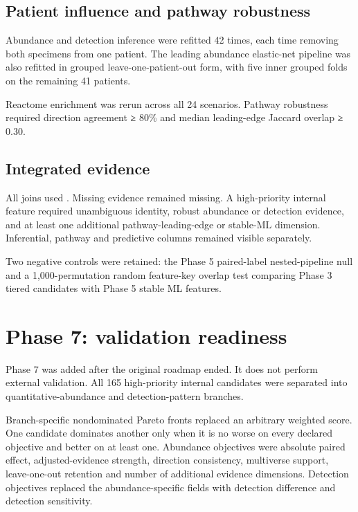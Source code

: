 \subsection{Patient influence and pathway robustness}

Abundance and detection inference were refitted 42 times, each time removing both specimens from one patient. The leading abundance elastic-net pipeline was also refitted in grouped leave-one-patient-out form, with five inner grouped folds on the remaining 41 patients.

Reactome enrichment was rerun across all 24 scenarios. Pathway robustness required direction agreement ≥ 80\% and median leading-edge Jaccard overlap ≥ 0.30.

\subsection{Integrated evidence}

All joins used . Missing evidence remained missing. A high-priority internal feature required unambiguous identity, robust abundance or detection evidence, and at least one additional pathway-leading-edge or stable-ML dimension. Inferential, pathway and predictive columns remained visible separately.

Two negative controls were retained: the Phase 5 paired-label nested-pipeline null and a 1,000-permutation random feature-key overlap test comparing Phase 3 tiered candidates with Phase 5 stable ML features.

\section{Phase 7: validation readiness}
\label{sec:phase_7_validation_readiness}

Phase 7 was added after the original roadmap ended. It does not perform external validation. All 165 high-priority internal candidates were separated into quantitative-abundance and detection-pattern branches.

Branch-specific nondominated Pareto fronts replaced an arbitrary weighted score. One candidate dominates another only when it is no worse on every declared objective and better on at least one. Abundance objectives were absolute paired effect, adjusted-evidence strength, direction consistency, multiverse support, leave-one-out retention and number of additional evidence dimensions. Detection objectives replaced the abundance-specific fields with detection difference and detection sensitivity.

